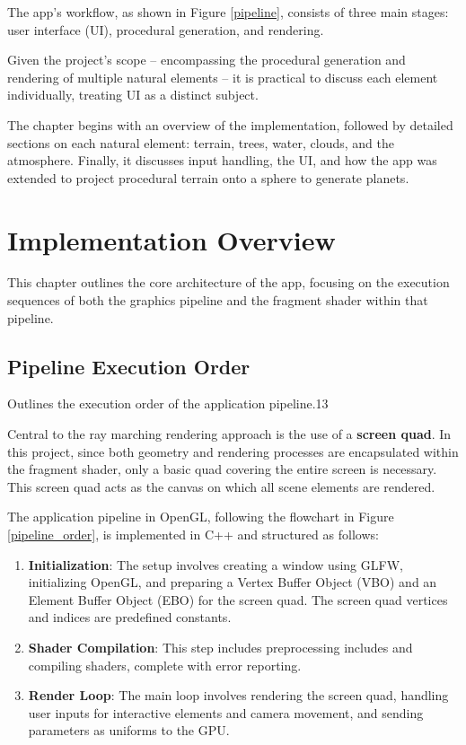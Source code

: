 \label{sec:3}

The app's workflow, as shown in Figure \ref{pipeline}, consists of three main stages: user interface (UI), procedural generation, and rendering.

Given the project's scope -- encompassing the procedural generation and rendering of multiple natural elements -- it is practical to discuss each element individually, treating UI as a distinct subject.

The chapter begins with an overview of the implementation, followed by detailed sections on each natural element: terrain, trees, water, clouds, and the atmosphere. Finally, it discusses input handling, the UI, and how the app was extended to project procedural terrain onto a sphere to generate planets.

\section{Implementation Overview}
\label{Implementation Overview}

This chapter outlines the core architecture of the app, focusing on the execution sequences of both the graphics pipeline and the fragment shader within that pipeline.

\subsection{Pipeline Execution Order}

{Outlines the execution order of the application pipeline.}{13}

Central to the ray marching rendering approach is the use of a \textbf{screen quad}. In this project, since both geometry and rendering processes are encapsulated within the fragment shader, only a basic quad covering the entire screen is necessary. This screen quad acts as the canvas on which all scene elements are rendered.


The application pipeline in OpenGL, following the flowchart in Figure \ref{pipeline_order}, is implemented in C++ and structured as follows:


\begin{enumerate}
    \item \textbf{Initialization}: The setup involves creating a window using GLFW, initializing OpenGL, and preparing a Vertex Buffer Object (VBO) and an Element Buffer Object (EBO) for the screen quad. The screen quad vertices and indices are predefined constants.
    \item \textbf{Shader Compilation}: This step includes preprocessing includes and compiling shaders, complete with error reporting.
    \item \textbf{Render Loop}: The main loop involves rendering the screen quad, handling user inputs for interactive elements and camera movement, and sending parameters as uniforms to the GPU.
\end{enumerate}

